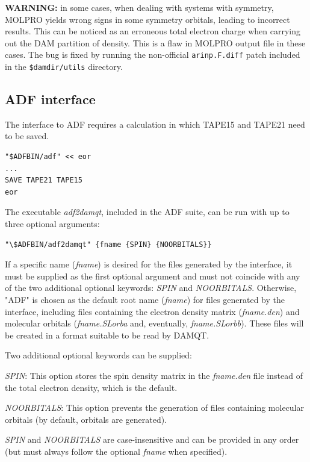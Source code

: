\documentclass[10pt]{article}
\begin{document}
{\bf WARNING:} in some cases, when dealing with systems with symmetry, MOLPRO yields wrong 
signs in some symmetry orbitals, leading to incorrect results. This can be noticed as an 
erroneous total electron charge when carrying out the DAM partition of density. 
This is a flaw in MOLPRO output file in these cases. The bug is fixed by running 
the non-official \texttt{arinp.F.diff} patch included in the \texttt{\$damdir/utils} directory.


\subsection{ADF interface \label{sec:5.3}}

The interface to ADF requires a calculation in which 
TAPE15 and TAPE21 need to be saved. 

\begin{verbatim}
"$ADFBIN/adf" << eor
...
SAVE TAPE21 TAPE15
eor
\end{verbatim}

The executable {\it adf2damqt}, included in the ADF suite, can be run with up to three optional arguments: 

\begin{verbatim}
"\$ADFBIN/adf2damqt" {fname {SPIN} {NOORBITALS}}
\end{verbatim}

If a specific name ({\it fname}) is desired for the files generated 
by the interface, it must be supplied 
as the first optional argument and must not coincide 
with any of the two additional optional keywords: {\it SPIN} and {\it NOORBITALS}. Otherwise,
"ADF" is chosen as the default root name ({\it fname}) 
for files generated by the interface, including files containing the electron 
density matrix ({\it fname.den}) and molecular orbitals ({\it fname.SLorba} and, 
eventually, {\it fname.SLorbb}). These files will be created in a format suitable to be 
read by DAMQT.

Two additional optional keywords can be supplied:

{\it SPIN}: This option stores the spin density matrix in the {\it fname.den} file instead of 
the total electron density, which is the default.

{\it NOORBITALS}: This option prevents the generation of files containing molecular orbitals (by 
default, orbitals are generated).

{\it SPIN} and {\it NOORBITALS} are case-insensitive and can be provided in any order 
(but must always follow the optional {\it fname} when specified).
\end{document}
